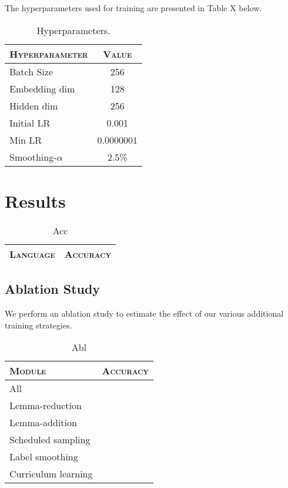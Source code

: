 \documentclass[11pt,a4paper]{article}
\begin{document}
The hyperparameters used for training are presented in Table X below.
\begin{table}[h]	
\centering
\begin{tabular}{lc}
\textsc{Hyperparameter} & \textsc{Value} \\
  \hline
  Batch Size & 256 \\
  Embedding dim & 128 \\
  Hidden dim & 256 \\
  Initial LR & 0.001 \\
  Min LR & 0.0000001 \\
  Smoothing-$\alpha$ & 2.5\% \\
\end{tabular} 
\caption{Hyperparameters.}
\label{tab:hp}
\end{table}

\section{Results}

\begin{table}[h]	
\centering
\begin{tabular}{lc}
\textsc{Language} & \textsc{Accuracy} \\
  \hline
  
\end{tabular} 
\caption{Acc}
\label{tab:accuracy}
\end{table}



\subsection{Ablation Study}

We perform an ablation study to estimate the effect of our various
additional training strategies.



\begin{table}[h]	
\centering
\begin{tabular}{lc}
\textsc{Module} & \textsc{Accuracy} \\
  \hline
  All  & \\
  Lemma-reduction & \\
  Lemma-addition & \\
  Scheduled sampling & \\
  Label smoothing & \\
  Curriculum learning & \\
\end{tabular} 
\caption{Abl}
\label{tab:abl}
\end{table}
\end{document}
